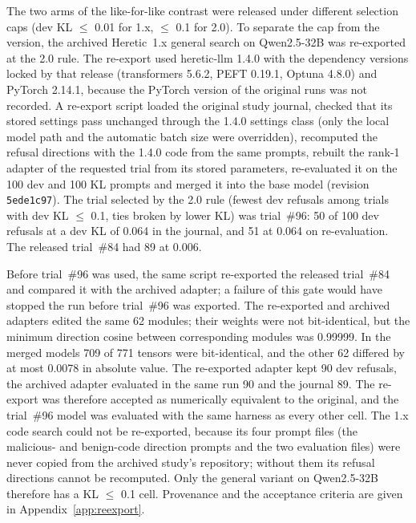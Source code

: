 The two arms of the like-for-like contrast were released under different selection caps (dev KL $\le$ 0.01 for
1.x, $\le$ 0.1 for 2.0). To separate the cap from the version, the archived Heretic~1.x general search on
Qwen2.5-32B was re-exported at the 2.0 rule. The re-export used heretic-llm 1.4.0 with the dependency versions
locked by that release (transformers 5.6.2, PEFT 0.19.1, Optuna 4.8.0) and PyTorch 2.14.1, because the PyTorch
version of the original runs was not recorded. A re-export script loaded the original study journal, checked that its stored
settings pass unchanged through the 1.4.0 settings class (only the local model path and the automatic batch size
were overridden), recomputed the refusal directions with the 1.4.0 code from the same prompts, rebuilt the rank-1
adapter of the requested trial from its stored parameters, re-evaluated it on the 100 dev and 100 KL prompts and
merged it into the base model (revision \texttt{5ede1c97}). The trial selected by the 2.0 rule (fewest dev
refusals among trials with dev KL $\le$ 0.1, ties broken by lower KL) was trial~\#96: 50 of 100 dev refusals at a
dev KL of 0.064 in the journal, and 51 at 0.064 on re-evaluation. The released trial~\#84 had 89 at 0.006.

Before trial~\#96 was used, the same script re-exported the released trial~\#84 and compared it with the archived
adapter; a failure of this gate would have stopped the run before trial~\#96 was exported. The re-exported and
archived adapters edited the same 62 modules; their weights were not bit-identical, but the minimum direction cosine
between corresponding modules was 0.99999. In the merged models 709 of 771 tensors were bit-identical, and the other
62 differed by at most 0.0078 in absolute value. The re-exported adapter kept 90 dev refusals, the archived adapter
evaluated in the same run 90 and the journal 89. The re-export was therefore accepted as numerically equivalent to the
original, and the trial~\#96 model was evaluated with the same harness as every other cell. The 1.x code search could
not be re-exported, because its four prompt files (the malicious- and benign-code direction prompts and the two
evaluation files) were never copied from the archived study's repository; without them its refusal directions cannot
be recomputed. Only the general variant on Qwen2.5-32B therefore has a KL $\le$ 0.1 cell. Provenance and the
acceptance criteria are given in Appendix~\ref{app:reexport}.

